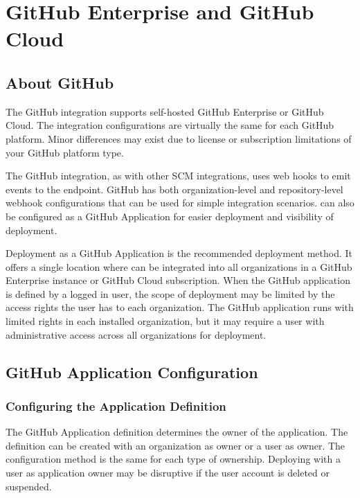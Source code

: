 \chapter{GitHub Enterprise and GitHub Cloud}

\section{About GitHub}

The GitHub integration supports self-hosted GitHub Enterprise or GitHub Cloud.  The integration configurations
are virtually the same for each GitHub platform.  Minor differences may exist due to license or subscription
limitations of your GitHub platform type.  

The GitHub integration, as with other SCM integrations, uses web hooks to emit events to the \cxoneflow endpoint.
GitHub has both organization-level and repository-level webhook configurations
that can be used for simple integration scenarios.  \cxoneflow can also be configured as a GitHub Application
for easier deployment and visibility of deployment.

Deployment as a GitHub Application is the recommended deployment method.  It offers a single location where
\cxoneflow can be integrated into all organizations in a GitHub Enterprise instance or GitHub Cloud subscription.
When the GitHub application is defined by a logged in user, the scope of deployment may be limited by the access rights
the user has to each organization.  The \cxoneflow GitHub application runs with limited rights in each installed
organization, but it may require a user with administrative access across all organizations for deployment.


\section{GitHub Application Configuration}

\subsection{Configuring the Application Definition}

The GitHub Application definition determines the owner of the application.  The definition can
be created with an organization as owner or a user as owner.  The configuration method is the same
for each type of ownership.  Deploying with a user as application owner may be disruptive if the user
account is deleted or suspended.

